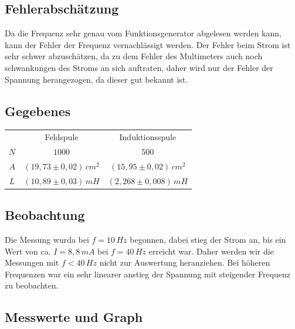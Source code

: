 \documentclass{article}
\begin{document}
\subsection{Fehlerabschätzung}
Da die Frequenz sehr genau vom Funktionsgenerator abgelesen werden kann, kann der Fehler der Frequenz vernachlässigt werden. Der Fehler beim Strom ist sehr schwer abzuschätzen, da zu dem Fehler des Multimeters auch noch schwankungen des Stroms an sich auftraten, daher wird nur der Fehler der Spannung herangezogen, da dieser gut bekannt ist.

\subsection{Gegebenes}

\begin{center}
\begin{tabular}{c c c}
 & Feldspule & Induktionsspule \\
 \(N\) & \(1000\) & \(500\) \\
\(A\) & \((19,73 \pm 0,02)\, cm^2\) & \((15,95 \pm 0,02)\, cm^2\) \\
 \(L\) & \((10,89 \pm 0,03)\, mH \) & \((2,268 \pm 0,008)\, mH \) \\

\end{tabular}
\end{center}

\subsection{Beobachtung}
Die Messung wurda bei \(f=10 \, Hz \) begonnen, dabei stieg der Strom an, bis ein Wert von ca. \(I = 8,8 \, mA \) bei \(f = 40 \, Hz \) erreicht war. Daher werden wir die Messungen mit \(f < 40\, Hz \) nicht zur Auswertung heranziehen. Bei höheren Frequenzen war ein sehr linearer anstieg der Spannung mit steigender Frequenz zu beobachten.
\subsection{Messwerte und Graph}
\end{document}
